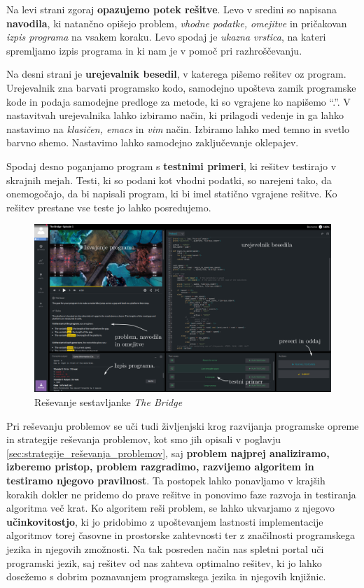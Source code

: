  Na levi strani zgoraj \textbf{opazujemo potek rešitve}. Levo v
 sredini so napisana \textbf{navodila}, ki natančno opišejo problem,
 \emph{vhodne podatke, omejitve } in pričakovan \emph{izpis programa}
 na vsakem koraku. Levo spodaj je \emph{ukazna vrstica}, na kateri
 spremljamo izpis programa in ki nam je v pomoč pri razhroščevanju.

 Na desni strani je \textbf{urejevalnik besedil}, v katerega pišemo
 rešitev oz program. Urejevalnik zna barvati programsko kodo,
 samodejno upošteva zamik programske kode in podaja samodejne predloge
 za metode, ki so vgrajene ko napišemo ``.''. V nastavitvah
 urejevalnika lahko izbiramo način, ki prilagodi vedenje in ga lahko
 nastavimo na \emph{klasičen, emacs} in \emph{vim} način. Izbiramo
 lahko med temno in svetlo barvno shemo. Nastavimo lahko samodejno
 zaključevanje oklepajev.

 Spodaj desno poganjamo program s \textbf{testnimi primeri}, ki
 rešitev testirajo v skrajnih mejah. Testi, ki so podani kot
 vhodni podatki, so narejeni tako, da onemogočajo, da bi napisali
 program, ki bi imel statično vgrajene rešitve. Ko rešitev prestane
 vse teste jo lahko posredujemo. 

\begin{figure}[h!]
  \centering
    \includegraphics [width=1\linewidth, keepaspectratio =
   1] {./images/sc_web/codingame_solving-v01.jpg}
   \caption{Reševanje sestavljanke \emph{The Bridge}
     \cite{web:codingame}}
   \label{fig:web:ca:solve}
 \end{figure}

 Pri reševanju problemov se uči tudi življenjski krog razvijanja
 programske opreme in strategije reševanja problemov, kot smo jih
 opisali v poglavju \ref{sec:strategije_reševanja_problemov}, saj
 \textbf{problem najprej analiziramo, izberemo pristop, problem
   razgradimo, razvijemo algoritem in testiramo njegovo
   pravilnost}. Ta postopek lahko ponavljamo v krajših korakih dokler
 ne pridemo do prave rešitve in ponovimo faze razvoja in testiranja
 algoritma več krat. Ko algoritem reši problem, se lahko ukvarjamo z
 njegovo \textbf{učinkovitostjo}, ki jo pridobimo z upoštevanjem
 lastnosti implementacije algoritmov torej časovne in prostorske
 zahtevnosti ter z značilnosti programskega jezika in njegovih
 zmožnosti. Na tak posreden način nas spletni portal uči programski
 jezik, saj rešitev od nas zahteva optimalno rešitev, ki jo lahko
 dosežemo s dobrim poznavanjem programskega jezika in njegovih
 knjižnic.

